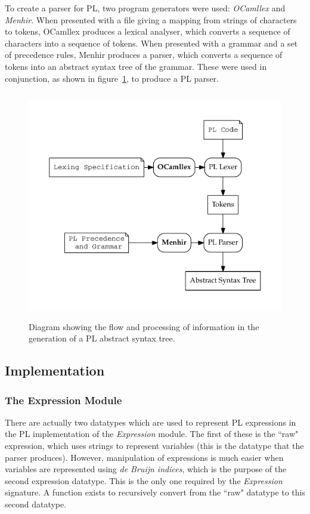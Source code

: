 \documentclass[12pt,a4paper,twoside,openright]{report}
\begin{document}
To create a parser for PL, two program generators were used:
\emph{OCamllex} and \emph{Menhir}. When presented with a
file giving a mapping from strings of characters to tokens,
OCamllex produces a lexical analyser, which converts a sequence
of characters into a sequence of tokens. When presented with a
grammar and a set of precedence rules, Menhir produces a parser,
which converts a sequence of tokens into an abstract syntax tree
of the grammar. These were used in conjunction, as shown in
figure~\ref{fig:parsing}, to produce a PL parser.

\begin{figure}
	\centering
	\includegraphics[height=10cm]{parsing}
	\caption{Diagram showing the flow and processing of
		information in the generation of a PL abstract
		syntax tree.}
	\label{fig:parsing}
\end{figure}

\subsection{Implementation}

\subsubsection{The Expression Module}
There are actually two datatypes which are used to
represent PL expressions in the
PL implementation of the \emph{Expression} module.
The first of these is the ``raw" expression, which
uses strings to represent variables (this is the
datatype that the parser produces). However,
manipulation of expressions is much easier when
variables are represented using \emph{de Bruijn indices},
which is the purpose of the second expression datatype.
This is the only one required by the \emph{Expression}
signature. A function exists to recursively convert
from the ``raw" datatype to this second datatype.
\end{document}
